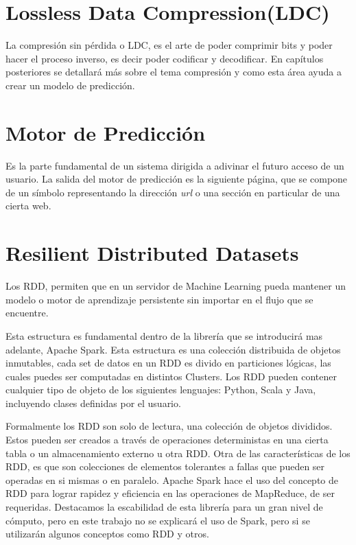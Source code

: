 \section{Lossless Data Compression(LDC)}

La compresión sin pérdida o LDC, es el arte de poder comprimir bits y poder hacer el proceso inverso, es decir poder codificar y decodificar. En capítulos posteriores se detallará más sobre el tema compresión y como esta área ayuda a crear un modelo de predicción.





\section{Motor de Predicción}

Es la parte fundamental de un sistema dirigida a adivinar el futuro acceso de un usuario. La salida del motor de predicción es la siguiente página, que se compone de un símbolo representando la dirección \emph{url} o una sección en particular de una cierta web. 

 


\section{Resilient Distributed Datasets }

	Los RDD, permiten que en un servidor de Machine Learning pueda mantener un modelo o motor de aprendizaje persistente sin importar en el flujo que se encuentre.

	Esta estructura es fundamental dentro de la librería que se introducirá mas adelante, Apache Spark. Esta estructura es una colección distribuida de objetos inmutables, cada 
	set de datos en un RDD es divido en particiones lógicas, las cuales puedes ser computadas en distintos Clusters. Los RDD pueden contener cualquier tipo de objeto de los siguientes lenguajes: Python, Scala y Java, incluyendo clases definidas por el usuario. 

	Formalmente los RDD son solo de lectura, una colección de objetos divididos. Estos pueden ser creados a través de  operaciones deterministas en una cierta tabla o un almacenamiento externo u otra RDD.
	Otra de las características de los RDD, es que son colecciones de elementos tolerantes a fallas que pueden ser operadas en si mismas o en paralelo.
	Apache Spark hace el uso del concepto de RDD para lograr rapidez y eficiencia en las operaciones de MapReduce, de ser requeridas. Destacamos la escabilidad de esta librería para un gran nivel de cómputo, pero en este trabajo no se explicará el uso de Spark, pero si se utilizarán algunos conceptos como RDD y otros.




